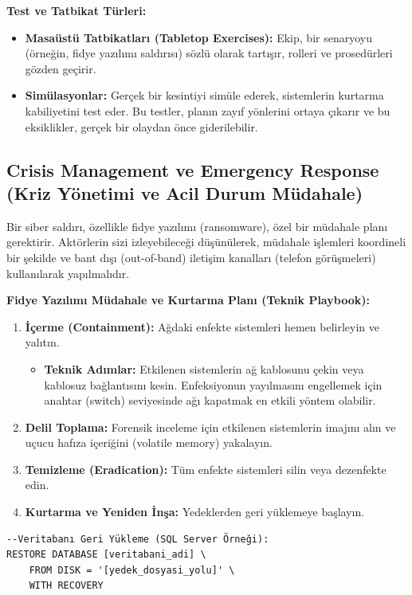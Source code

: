 \textbf{Test ve Tatbikat Türleri:}
\begin{itemize}
    \item \textbf{Masaüstü Tatbikatları (Tabletop Exercises):} Ekip, bir senaryoyu (örneğin, fidye yazılımı saldırısı) sözlü olarak tartışır, rolleri ve prosedürleri gözden geçirir.
    \item \textbf{Simülasyonlar:} Gerçek bir kesintiyi simüle ederek, sistemlerin kurtarma kabiliyetini test eder. Bu testler, planın zayıf yönlerini ortaya çıkarır ve bu eksiklikler, gerçek bir olaydan önce giderilebilir.
\end{itemize}

\subsection{Crisis Management ve Emergency Response (Kriz Yönetimi ve Acil Durum Müdahale)}

Bir siber saldırı, özellikle fidye yazılımı (ransomware), özel bir müdahale planı gerektirir. Aktörlerin sizi izleyebileceği düşünülerek, müdahale işlemleri koordineli bir şekilde ve bant dışı (out-of-band) iletişim kanalları (telefon görüşmeleri) kullanılarak yapılmalıdır.

\textbf{Fidye Yazılımı Müdahale ve Kurtarma Planı (Teknik Playbook):}
\begin{enumerate}
    \item \textbf{İçerme (Containment):} Ağdaki enfekte sistemleri hemen belirleyin ve yalıtın.
    \begin{itemize}
        \item \textbf{Teknik Adımlar:} Etkilenen sistemlerin ağ kablosunu çekin veya kablosuz bağlantısını kesin. Enfeksiyonun yayılmasını engellemek için anahtar (switch) seviyesinde ağı kapatmak en etkili yöntem olabilir.
    \end{itemize}
    \item \textbf{Delil Toplama:} Forensik inceleme için etkilenen sistemlerin imajını alın ve uçucu hafıza içeriğini (volatile memory) yakalayın.
    \item \textbf{Temizleme (Eradication):} Tüm enfekte sistemleri silin veya dezenfekte edin.
    \item \textbf{Kurtarma ve Yeniden İnşa:} Yedeklerden geri yüklemeye başlayın.
\end{enumerate}

\begin{verbatim}
--Veritabanı Geri Yükleme (SQL Server Örneği):
RESTORE DATABASE [veritabani_adi] \
    FROM DISK = '[yedek_dosyasi_yolu]' \
    WITH RECOVERY
\end{verbatim}

